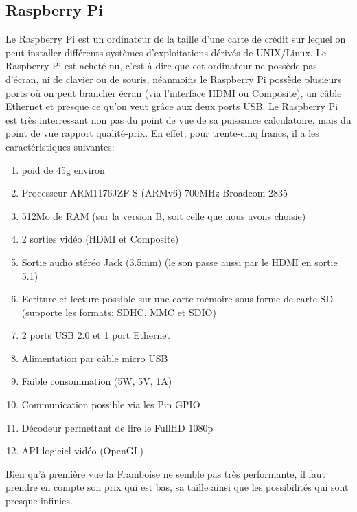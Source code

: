 \documentclass[a4paper,12pt]{article}
\begin{document}
{\subsection{Raspberry Pi}
Le Raspberry Pi\cite{RaspberryPiCaracteristiques} est un ordinateur de la taille d'une carte de crédit sur lequel on peut installer différents systèmes d'exploitations dérivés de UNIX/Linux. Le Raspberry Pi est acheté nu, c'est-à-dire que cet ordinateur ne possède pas d'écran, ni de clavier ou de souris, néanmoins le Raspberry Pi possède plusieurs ports où on peut brancher écran (via l'interface HDMI ou Composite), un câble Ethernet et presque ce qu'on veut grâce aux deux ports USB. Le Raspberry Pi est très interressant non pas du point de vue de sa puissance calculatoire, mais du point de vue rapport qualité-prix. En effet, pour trente-cinq francs, il a les caractéristiques suivantes: 
\begin{enumerate}
\item poid de 45g environ
\item Processeur ARM1176JZF-S (ARMv6) 700MHz Broadcom 2835
\item 512Mo de RAM (sur la version B, soit celle que nous avons choisie)
\item 2 sorties vidéo (HDMI et Composite) 
\item Sortie audio stéréo Jack (3.5mm) (le son passe aussi par le HDMI en sortie 5.1)
\item Ecriture et lecture possible sur une carte mémoire sous forme de carte SD (supporte les formats: SDHC, MMC et SDIO)
\item 2 ports USB 2.0 et 1 port Ethernet
\item Alimentation par câble micro USB
\item Faible consommation (5W, 5V, 1A)
\item Communication possible via les Pin GPIO
\item Décodeur permettant de lire le FullHD  1080p
\item API logiciel vidéo (OpenGL)
\end{enumerate}
Bien qu'à première vue la Framboise ne semble pas très performante, il faut prendre en compte son prix qui est bas, sa taille ainsi que les possibilités qui sont presque infinies.

}
\end{document}
